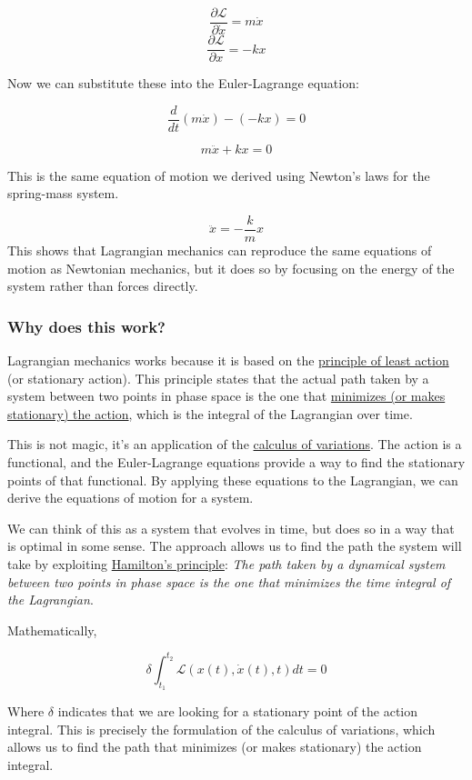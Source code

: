 \documentclass[11pt]{article}
\begin{document}
\[\frac{\partial \mathcal{L}}{\partial \dot{x}} = m \dot{x}\]
\[\frac{\partial \mathcal{L}}{\partial x} = -k x\]

Now we can substitute these into the Euler-Lagrange equation:

\[
\frac{d}{dt} \left( m \dot{x} \right) - (-k x) = 0
\]

\[m\ddot{x} + kx = 0\]

This is the same equation of motion we derived using Newton's laws for
the spring-mass system.

\[\ddot{x} = -\frac{k}{m} x\] This shows that Lagrangian mechanics can
reproduce the same equations of motion as Newtonian mechanics, but it
does so by focusing on the energy of the system rather than forces
directly.

    \subsubsection{Why does this work?}\label{why-does-this-work}

Lagrangian mechanics works because it is based on the
\href{https://en.wikipedia.org/wiki/Action_principles}{principle of
least action} (or stationary action). This principle states that the
actual path taken by a system between two points in phase space is the
one that
\href{https://en.wikipedia.org/wiki/Hamilton\%27s_principle}{minimizes
(or makes stationary) the action}, which is the integral of the
Lagrangian over time.

This is not magic, it's an application of the
\href{https://en.wikipedia.org/wiki/Calculus_of_variations}{calculus of
variations}. The action is a functional, and the Euler-Lagrange
equations provide a way to find the stationary points of that
functional. By applying these equations to the Lagrangian, we can derive
the equations of motion for a system.

We can think of this as a system that evolves in time, but does so in a
way that is optimal in some sense. The approach allows us to find the
path the system will take by exploiting
\href{https://en.wikipedia.org/wiki/Hamilton\%27s_principle}{Hamilton's
principle}: \emph{The path taken by a dynamical system between two
points in phase space is the one that minimizes the time integral of the
Lagrangian}.

Mathematically,

\[\delta \int_{t_1}^{t_2} \mathcal{L}(x(t), \dot{x}(t), t) dt = 0\]

Where \(\delta\) indicates that we are looking for a stationary point of
the action integral. This is precisely the formulation of the calculus
of variations, which allows us to find the path that minimizes (or makes
stationary) the action integral.
\end{document}
